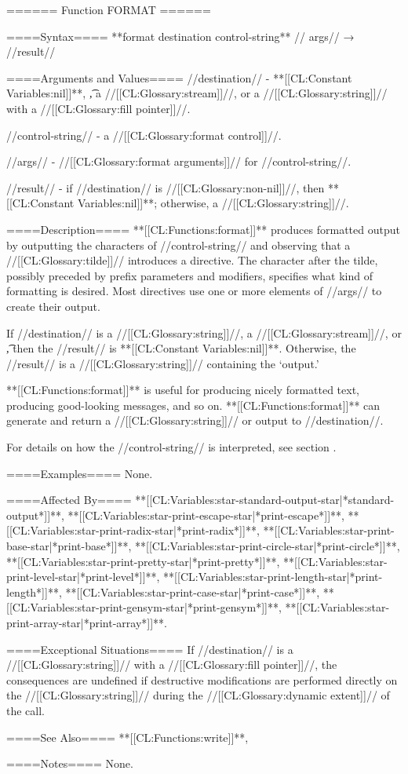 ====== Function FORMAT ======

====Syntax====
**{format} {destination control-string** //\rest} args// → //result//

====Arguments and Values====
//destination// - **[[CL:Constant Variables:nil]]**, \t, a //[[CL:Glossary:stream]]//, or a //[[CL:Glossary:string]]// with a //[[CL:Glossary:fill pointer]]//.

//control-string// - a //[[CL:Glossary:format control]]//.

//args// - //[[CL:Glossary:format arguments]]// for //control-string//.

//result// - if //destination// is //[[CL:Glossary:non-nil]]//, then **[[CL:Constant Variables:nil]]**; otherwise, a //[[CL:Glossary:string]]//.

====Description====
**[[CL:Functions:format]]** produces formatted output by outputting the characters of //control-string// and observing that a //[[CL:Glossary:tilde]]// introduces a directive. The character after the tilde, possibly preceded by prefix parameters and modifiers, specifies what kind of formatting is desired. Most directives use one or more elements of //args// to create their output.

If //destination// is a //[[CL:Glossary:string]]//, a //[[CL:Glossary:stream]]//, or \t, then the //result// is **[[CL:Constant Variables:nil]]**. Otherwise, the //result// is a //[[CL:Glossary:string]]// containing the `output.'

**[[CL:Functions:format]]** is useful for producing nicely formatted text, producing good-looking messages, and so on. **[[CL:Functions:format]]** can generate and return a //[[CL:Glossary:string]]// or output to //destination//.

For details on how the //control-string// is interpreted, see section {\secref\FormattedOutput}.

====Examples====
None.

====Affected By====
**[[CL:Variables:star-standard-output-star|*standard-output*]]**, **[[CL:Variables:star-print-escape-star|*print-escape*]]**, **[[CL:Variables:star-print-radix-star|*print-radix*]]**, **[[CL:Variables:star-print-base-star|*print-base*]]**, **[[CL:Variables:star-print-circle-star|*print-circle*]]**, **[[CL:Variables:star-print-pretty-star|*print-pretty*]]**, **[[CL:Variables:star-print-level-star|*print-level*]]**, **[[CL:Variables:star-print-length-star|*print-length*]]**, **[[CL:Variables:star-print-case-star|*print-case*]]**, **[[CL:Variables:star-print-gensym-star|*print-gensym*]]**, **[[CL:Variables:star-print-array-star|*print-array*]]**.

====Exceptional Situations====
If //destination// is a //[[CL:Glossary:string]]// with a //[[CL:Glossary:fill pointer]]//, the consequences are undefined if destructive modifications are performed directly on the //[[CL:Glossary:string]]// during the //[[CL:Glossary:dynamic extent]]// of the call.

====See Also====
**[[CL:Functions:write]]**, {\secref\ImplementationDefinedScripts}

====Notes====
None.

 
